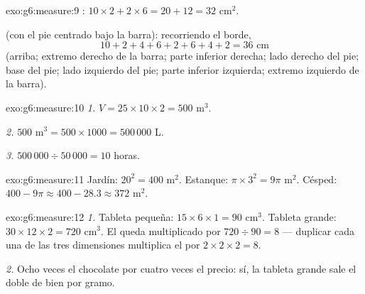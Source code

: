 \begin{solution}{exo:g6:measure:9}
: $10 \times 2 + 2 \times 6 = 20 + 12 = 32$ cm$^2$.

 (con el pie centrado bajo la barra): recorriendo el borde,
\[
10 + 2 + 4 + 6 + 2 + 6 + 4 + 2 = 36 \text{ cm}
\]
(arriba; extremo derecho de la barra; parte inferior derecha; lado derecho del pie; base del
pie; lado izquierdo del pie; parte inferior izquierda; extremo izquierdo de la barra).
\end{solution}

\begin{solution}{exo:g6:measure:10}
\emph{1.} $V = 25 \times 10 \times 2 = 500$ m$^3$.

\emph{2.} $500$ m$^3 = 500 \times 1000 = 500\,000$ L.

\emph{3.} $500\,000 \div 50\,000 = 10$ horas.
\end{solution}

\begin{solution}{exo:g6:measure:11}
Jardín: $20^2 = 400$ m$^2$. Estanque: $\pi \times 3^2 = 9\pi$ m$^2$.
Césped: $400 - 9\pi \approx 400 - 28.3 \approx 372$ m$^2$.
\end{solution}

\begin{solution}{exo:g6:measure:12}
\emph{1.} Tableta pequeña: $15 \times 6 \times 1 = 90$ cm$^3$. Tableta grande:
$30 \times 12 \times 2 = 720$ cm$^3$. El  queda multiplicado por
$720 \div 90 = 8$ --- duplicar cada una de las tres dimensiones multiplica
el  por $2 \times 2 \times 2 = 8$.

\emph{2.} Ocho veces el chocolate por cuatro veces el precio: sí, la
tableta grande sale el doble de bien por gramo.
\end{solution}

